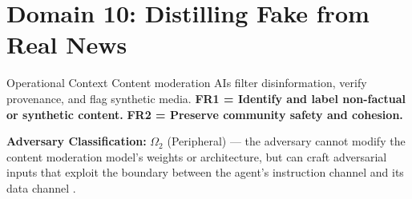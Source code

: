 \documentclass[
  ignorenonframetext,
]{beamer}
\author{\texorpdfstring{}{}}
\date{}
\begin{document}
\section{Domain 10: Distilling Fake from Real
News}\label{sec:domain_fake_news}

\begin{frame}[allowframebreaks]{Operational Context}
\protect{}\label{operational-context}
Content moderation AIs filter disinformation, verify provenance, and
flag synthetic media. \textbf{FR1 = Identify and label non-factual or
synthetic content.} \textbf{FR2 = Preserve community safety and
cohesion.}

\textbf{Adversary Classification:} \(\Omega_2\) (Peripheral) --- the
adversary cannot modify the content moderation model's weights or
architecture, but can craft adversarial inputs that exploit the boundary
between the agent's instruction channel and its data channel
\cite{friedman2026cogsec1}.
\end{frame}
\end{document}
